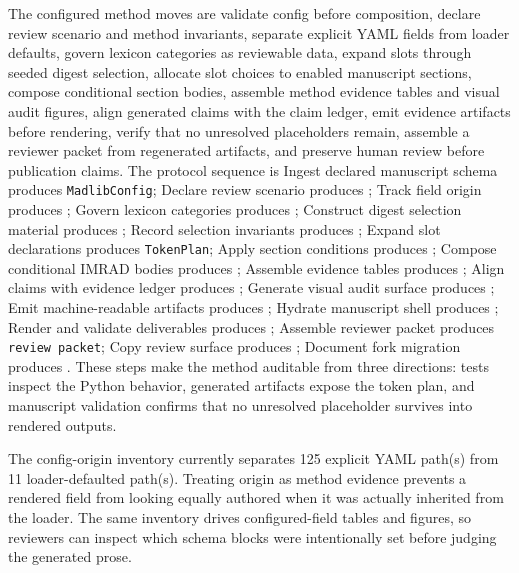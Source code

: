 \documentclass[
  english,
]{article}
\begin{document}
The configured method moves are validate config before composition,
declare review scenario and method invariants, separate explicit YAML
fields from loader defaults, govern lexicon categories as reviewable
data, expand slots through seeded digest selection, allocate slot
choices to enabled manuscript sections, compose conditional section
bodies, assemble method evidence tables and visual audit figures, align
generated claims with the claim ledger, emit evidence artifacts before
rendering, verify that no unresolved placeholders remain, assemble a
reviewer packet from regenerated artifacts, and preserve human review
before publication claims. The protocol sequence is Ingest declared
manuscript schema produces \texttt{MadlibConfig}; Declare review
scenario produces ; Track field origin produces
; Govern lexicon categories
produces ; Construct digest selection
material produces ; Record selection
invariants produces ; Expand slot
declarations produces \texttt{TokenPlan}; Apply section conditions
produces ; Compose conditional IMRAD
bodies produces ; Assemble evidence tables
produces ; Align claims with evidence
ledger produces ; Generate
visual audit surface produces ; Emit
machine-readable artifacts produces
; Hydrate
manuscript shell produces ; Render and
validate deliverables produces ;
Assemble reviewer packet produces \texttt{review\ packet}; Copy review
surface produces ; Document
fork migration produces . These steps
make the method auditable from three directions: tests inspect the
Python behavior, generated artifacts expose the token plan, and
manuscript validation confirms that no unresolved placeholder survives
into rendered outputs.

The config-origin inventory currently separates 125 explicit YAML
path(s) from 11 loader-defaulted path(s). Treating origin as method
evidence prevents a rendered field from looking equally authored when it
was actually inherited from the loader. The same inventory drives
configured-field tables and figures, so reviewers can inspect which
schema blocks were intentionally set before judging the generated prose.
\end{document}
